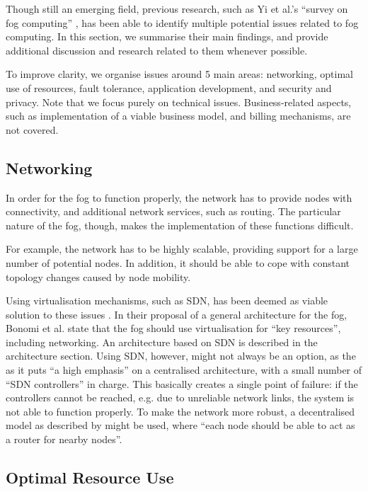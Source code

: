 \documentclass{article}
\begin{document}
Though still an emerging field, previous research, such as Yi et al.'s ``survey on fog computing'' \cite{yi2015survey}, has been able to identify multiple potential issues related to fog computing. In this section, we summarise their main findings, and provide additional discussion and research related to them whenever possible.

To improve clarity, we organise issues around 5 main areas: networking, optimal use of resources, fault tolerance, application development, and security and privacy. Note that we focus purely on technical issues. Business-related aspects, such as implementation of a viable business model, and billing mechanisms, are not covered.

\subsection{Networking}
In order for the fog to function properly, the network has to provide nodes with connectivity, and additional network services, such as routing. The particular nature of the fog, though, makes the implementation of these functions difficult. 

For example, the network has to be highly scalable, providing support for a large number of potential nodes. In addition, it should be able to cope with constant topology changes caused by node mobility.

Using virtualisation mechanisms, such as SDN, has been deemed as viable solution to these issues \cite{yi2015survey}. In their proposal of a general architecture for the fog, Bonomi et al. \cite{bonomi2014fog} state that the fog should use virtualisation for ``key resources'', including networking. An architecture based on SDN is described in the architecture section. Using SDN, however, might not always be an option, as the as it puts ``a high emphasis'' \cite{peng2016fog} on a centralised architecture, with a small number of ``SDN controllers'' in charge. This basically creates a single point of failure: if the controllers cannot be reached, e.g. due to unreliable network links, the system is not able to function properly. To make the network more robust, a decentralised model as described by \cite{yi2015survey} might be used, where  ``each node should be able to act as a router for nearby nodes''. 

\subsection{Optimal Resource Use}
\label{sub_opt_res_use}
\end{document}
